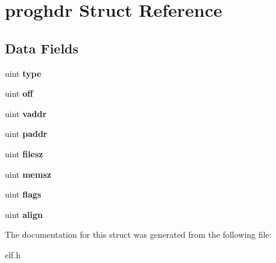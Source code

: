 \hypertarget{structproghdr}{}\section{proghdr Struct Reference}
\label{structproghdr}
\subsection*{Data Fields}
\begin{DoxyCompactItemize}
\item 
uint {\bfseries type}\hypertarget{structproghdr_a42ea22dcdaa75a9cbdf7cd366b85e9ea}{}\label{structproghdr_a42ea22dcdaa75a9cbdf7cd366b85e9ea}

\item 
uint {\bfseries off}\hypertarget{structproghdr_a979532386fd448596cc5046339a2cd2d}{}\label{structproghdr_a979532386fd448596cc5046339a2cd2d}

\item 
uint {\bfseries vaddr}\hypertarget{structproghdr_a6fa1051e19935bbedc5eaf086f5330b4}{}\label{structproghdr_a6fa1051e19935bbedc5eaf086f5330b4}

\item 
uint {\bfseries paddr}\hypertarget{structproghdr_af65905aa5c4ccb33aac7dad5783e14d9}{}\label{structproghdr_af65905aa5c4ccb33aac7dad5783e14d9}

\item 
uint {\bfseries filesz}\hypertarget{structproghdr_a95dee0f1864ec1602f1ff6998ac00df0}{}\label{structproghdr_a95dee0f1864ec1602f1ff6998ac00df0}

\item 
uint {\bfseries memsz}\hypertarget{structproghdr_a9f703ade191af1054b3de797d8167d89}{}\label{structproghdr_a9f703ade191af1054b3de797d8167d89}

\item 
uint {\bfseries flags}\hypertarget{structproghdr_ab3ad45ccf4b38dec384206ecbd099076}{}\label{structproghdr_ab3ad45ccf4b38dec384206ecbd099076}

\item 
uint {\bfseries align}\hypertarget{structproghdr_a9a7d455ad6830cd1a37aa324911880ec}{}\label{structproghdr_a9a7d455ad6830cd1a37aa324911880ec}

\end{DoxyCompactItemize}


The documentation for this struct was generated from the following file\+:\begin{DoxyCompactItemize}
\item 
elf.\+h\end{DoxyCompactItemize}
